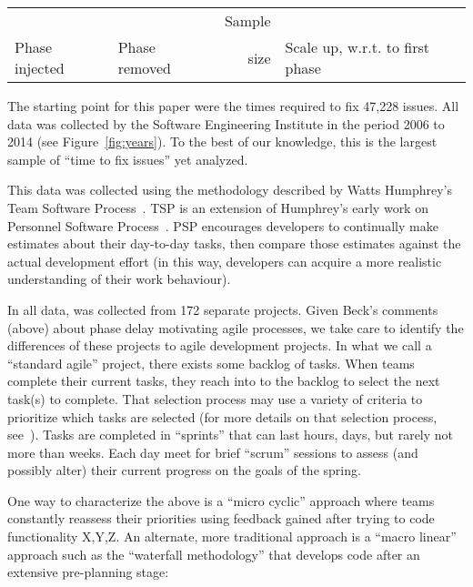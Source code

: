 \documentclass{sig-alternate}
\newcommand{\fig}[1]{Figure~\ref{fig:#1}}
\def\baselinestretch{1}
\begin{document}
\begin{figure*}[!t]

\renewcommand{\baselinestretch}{0.7}
\small
\begin{center}
\begin{tabular}{ll|r|rl}
            &                  & Sample\\
Phase injected & Phase removed & size & \multicolumn{2}{l}{Scale up, w.r.t. to first phase}

\end{tabular}
\end{center}
\caption{Scale ups for median time to resolve issues (taken from \fig{raw}).}
\label{fig:scale}
\end{figure*}

The starting point for this paper were the times required to fix 47,228 issues.
All data was collected
by the Software Engineering Institute in the period 2006 to 2014 (see \fig{years}).
To the best of our knowledge, this is the largest sample of ``time to fix issues''
yet analyzed. 

This data was collected using the   methodology described by
Watts Humphrey's Team Software Process~\cite{tsp00}. TSP is an extension of Humphrey's early
work on Personnel Software Process~\cite{psp05}.  PSP encourages developers to continually make estimates
about their day-to-day tasks, then compare those estimates against the actual development effort
(in this way, developers can acquire a more realistic understanding of their work behaviour).

In all data, was collected from 172 separate projects. Given Beck's comments (above) about phase delay motivating agile processes, we take care to identify the differences of these 
projects to agile development projects. In what we call a ``standard agile'' project, there exists
some backlog of tasks. When teams complete their current tasks, they reach into to the backlog
to select the next task(s) to complete. That selection process may use a variety of criteria
to prioritize which  tasks are selected (for more details on that selection process, see~\cite{me09j,port08,boehmturner03}). Tasks are completed in ``sprints'' that can last hours,
days, but rarely not more than weeks. Each day meet for brief ``scrum'' sessions to assess (and possibly alter) their current progress on the goals of the spring.  

One way to characterize the above is a ``micro cyclic'' approach where teams 
constantly reassess their priorities using feedback gained after trying to code 
functionality X,Y,Z. An alternate, more traditional approach is a ``macro linear''
approach such as the ``waterfall methodology'' that develops code after an extensive
pre-planning stage:
\end{document}
